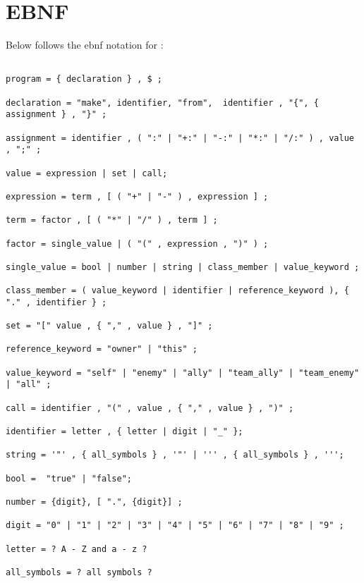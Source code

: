 \section{\langname{} EBNF}
Below follows the \ac{ebnf} notation for \langname{}:
{\begin{lstlisting}[numbers=none]

program = { declaration } , $ ;

declaration = "make", identifier, "from",  identifier , "{", { assignment } , "}" ;

assignment = identifier , ( ":" | "+:" | "-:" | "*:" | "/:" ) , value , ";" ;

value = expression | set | call;

expression = term , [ ( "+" | "-" ) , expression ] ;

term = factor , [ ( "*" | "/" ) , term ] ;

factor = single_value | ( "(" , expression , ")" ) ;

single_value = bool | number | string | class_member | value_keyword ;

class_member = ( value_keyword | identifier | reference_keyword ), { "." , identifier } ;

set = "[" value , { "," , value } , "]" ;

reference_keyword = "owner" | "this" ;

value_keyword = "self" | "enemy" | "ally" | "team_ally" | "team_enemy" | "all" ;

call = identifier , "(" , value , { "," , value } , ")" ;

identifier = letter , { letter | digit | "_" };

string = '"' , { all_symbols } , '"' | ''' , { all_symbols } , ''';

bool =  "true" | "false";

number = {digit}, [ ".", {digit}] ;

digit = "0" | "1" | "2" | "3" | "4" | "5" | "6" | "7" | "8" | "9" ;

letter = ? A - Z and a - z ?

all_symbols = ? all symbols ?

\end{lstlisting}}

